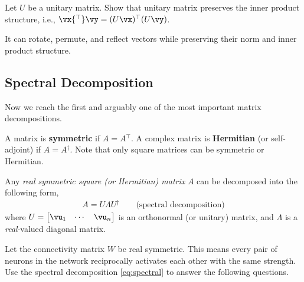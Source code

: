 \documentclass[a4paper,11pt]{exam}
\newcounter{ct}
\newcommand{\trp}{{^\top}} %
\newcommand{\ctrp}{{^\dagger}} %
\begin{document}
\begin{questions}
\question Let $U$ be a unitary matrix. Show that unitary matrix preserves the inner product structure, i.e., $\vx\trp \vy = (U \vx)\trp (U\vy)$.

\begin{tcolorbox}[colback=black!1!,title=Unitary or Orthonormal Matrix]
    It can rotate, permute, and reflect vectors while preserving their norm and inner product structure.
\end{tcolorbox}

\clearpage
\subsection{Spectral Decomposition}
Now we reach the first and arguably one of the most important matrix decompositions.

A matrix is \textbf{symmetric} if $A = A\trp$. A complex matrix is \textbf{Hermitian} (or self-adjoint) if $A = A\ctrp$.
Note that only square matrices can be symmetric or Hermitian.

\begin{tcolorbox}[colback=black!1!,title=Spectral theorem for Hermitian matrices]
Any \textit{real symmetric square (or Hermitian) matrix} $A$ can be decomposed into the following form,
\begin{align}\label{eq:spectral}
    A = U \Lambda U\ctrp \qquad \text{(spectral decomposition)}
\end{align}
where $U = \begin{bmatrix}\vu_1 & \cdots & \vu_n \end{bmatrix}$
is an orthonormal (or unitary) matrix, and $\Lambda$ is a \emph{real}-valued diagonal matrix.
\end{tcolorbox}

\question Let the connectivity matrix $W$ be real symmetric. This means every pair of neurons in the network reciprocally activates each other with the same strength.
Use the spectral decomposition \eqref{eq:spectral} to answer the following questions.
\end{questions}
\end{document}
